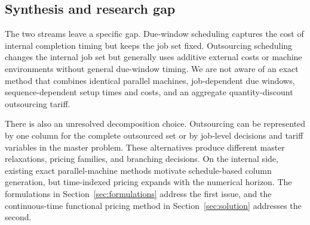 \subsection{Synthesis and research gap}

The two streams leave a specific gap. Due-window scheduling captures the cost of
internal completion timing but keeps the job set fixed. Outsourcing scheduling
changes the internal job set but generally uses additive external costs or machine
environments without general due-window timing. We are not aware of an exact method
that combines identical parallel machines, job-dependent due windows,
sequence-dependent setup times and costs, and an aggregate quantity-discount
outsourcing tariff.

There is also an unresolved decomposition choice. Outsourcing can be represented by
one column for the complete outsourced set or by job-level decisions and tariff
variables in the master problem. These alternatives produce different master
relaxations, pricing families, and branching decisions. On the internal side,
existing exact parallel-machine methods motivate schedule-based column generation,
but time-indexed pricing expands with the numerical horizon. The formulations in
Section~\ref{sec:formulations} address the first issue, and the continuous-time
functional pricing method in Section~\ref{sec:solution} addresses the second.
